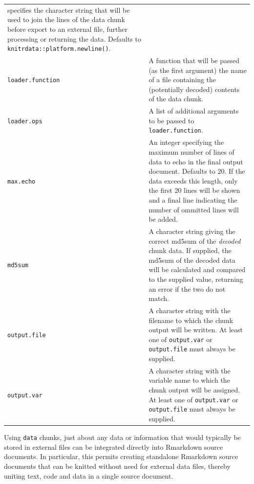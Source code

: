 \begin{longtable}[]{@{}
  >{\raggedright\arraybackslash}p{}
  >{\raggedright\arraybackslash}p{}@{}}
specifies the character string that will be used
to join the lines of the data chunk before export
to an external file, further processing or
returning the data. Defaults to
\texttt{knitrdata::platform.newline()}. \\
\texttt{loader.function} & A function that will be passed (as the first
argument) the name of a file containing the
(potentially decoded) contents of the data chunk. \\
\texttt{loader.ops} & A list of additional arguments to be passed to
\texttt{loader.function}. \\
\texttt{max.echo} & An integer specifying the maximum number of lines
of data to echo in the final output document.
Defaults to 20. If the data exceeds this length,
only the first 20 lines will be shown and a final
line indicating the number of ommitted lines will
be added. \\
\texttt{md5sum} & A character string giving the correct md5sum of
the \emph{decoded} chunk data. If supplied, the md5sum
of the decoded data will be calculated and
compared to the supplied value, returning an error
if the two do not match. \\
\texttt{output.file} & A character string with the filename to which the
chunk output will be written. At least one of
\texttt{output.var} or \texttt{output.file} must always be
supplied. \\
\texttt{output.var} & A character string with the variable name to which
the chunk output will be assigned. At least one of
\texttt{output.var} or \texttt{output.file} must always be
supplied. \\
\bottomrule()
\end{longtable}

Using \texttt{data} chunks, just about any data or information that would typically be stored in external files can be integrated directly into Rmarkdown source documents. In particular, this permits creating standalone Rmarkdown source documents that can be knitted without need for external data files, thereby uniting text, code and data in a single source document.

